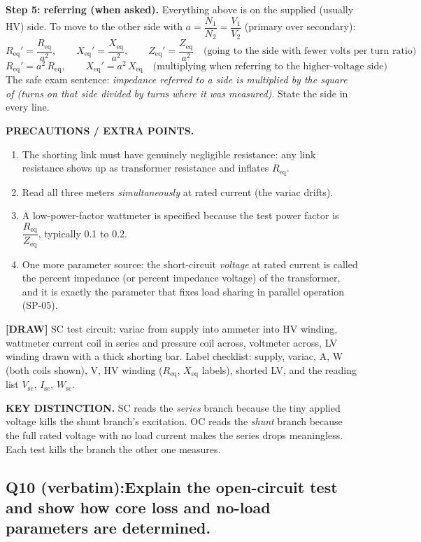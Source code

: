 \documentclass[11pt]{article}
\newcommand{\qhead}[2]{\subsection*{\color{copper}#1\quad\color{iron}#2}}
\newcommand{\tagline}[1]{\textbf{\color{copper}#1}}
\newcommand{\keydist}[1]{\vspace{2pt}\textbf{\color{red}KEY DISTINCTION.} #1}
\newcommand{\drawline}[1]{\textbf{\color{muted}[DRAW]} #1}
\begin{document}
\textbf{Step 5: referring (when asked).} Everything above is on the supplied (usually HV) side. To move to the other side with $a = \dfrac{N_1}{N_2} = \dfrac{V_1}{V_2}$ (primary over secondary):
\[
R_{\text{eq}}' = \frac{R_{\text{eq}}}{a^{2}}, \qquad
X_{\text{eq}}' = \frac{X_{\text{eq}}}{a^{2}}, \qquad
Z_{\text{eq}}' = \frac{Z_{\text{eq}}}{a^{2}}
\quad\text{(going to the side with fewer volts per turn ratio)}
\]
\[
R_{\text{eq}}' = a^{2}\, R_{\text{eq}}, \qquad
X_{\text{eq}}' = a^{2}\, X_{\text{eq}}
\quad\text{(multiplying when referring to the higher-voltage side)}
\]
The safe exam sentence: \emph{impedance referred to a side is multiplied by the square of (turns on that side divided by turns where it was measured)}. State the side in every line.

\tagline{PRECAUTIONS / EXTRA POINTS.}
\begin{enumerate}[label=\arabic*.]
\item The shorting link must have genuinely negligible resistance: any link resistance shows up as transformer resistance and inflates $R_{\text{eq}}$.
\item Read all three meters \emph{simultaneously} at rated current (the variac drifts).
\item A low-power-factor wattmeter is specified because the test power factor is $\dfrac{R_{\text{eq}}}{Z_{\text{eq}}}$, typically 0.1 to 0.2.
\item One more parameter source: the short-circuit \emph{voltage} at rated current is called the percent impedance (or percent impedance voltage) of the transformer, and it is exactly the parameter that fixes load sharing in parallel operation (SP-05).
\end{enumerate}

\drawline{SC test circuit: variac from supply into ammeter into HV winding, wattmeter current coil in series and pressure coil across, voltmeter across, LV winding drawn with a thick shorting bar. Label checklist: supply, variac, A, W (both coils shown), V, HV winding ($R_{\text{eq}}$, $X_{\text{eq}}$ labels), shorted LV, and the reading list $V_{\text{sc}}$, $I_{\text{sc}}$, $W_{\text{sc}}$.}

\keydist{SC reads the \emph{series} branch because the tiny applied voltage kills the shunt branch's excitation. OC reads the \emph{shunt} branch because the full rated voltage with no load current makes the series drops meaningless. Each test kills the branch the other one measures.}

\qhead{Q10 (verbatim):}{Explain the open-circuit test and show how core loss and no-load parameters are determined.}
\end{document}
